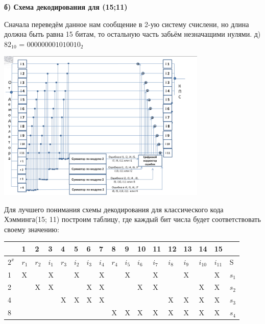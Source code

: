 	\newpage
	\begin{flushleft}
		\textbf{б) Схема декодирования для (15;11)}
		\linebreak
		\vspace*{10mm}
		
		\small Сначала переведём данное нам сообщение в 2-ую систему счислени, но длина должна быть равна 15 битам, то остальную часть забьём незначащими нулями.
		\linebreak
		\small д) $82_{10}$ = $000000001010010_2$
		\linebreak
		\vspace*{5mm}
		
		\includegraphics[width=10cm]{screen8}
		\vspace*{5mm}
		
		\small Для лучшего понимания схемы декодирования для классического кода Хэмминга(15; 11) построим таблицу, где каждый бит числа будет соответствовать своему значению:
		\linebreak
	\end{flushleft}

	\begin{table}[ht]
		\centering
		\begin{tabular}{|p{5mm}|p{5mm}|p{5mm}|p{5mm}|p{5mm}|p{5mm}|p{5mm}|p{5mm}|p{5mm}|p{5mm}|p{5mm}|p{5mm}|p{5mm}|p{5mm}|p{5mm}|p{5mm}|p{5mm}|}
			\hline
			& 1 & 2 & 3 & 4 & 5 & 6 & 7 & 8 & 9 & 10 & 11 & 12 & 13 & 14 & 15 & \\
			\hline
			$2^x$ & $r_1$ & $r_2$ & $i_1$ & $r_3$ & $i_2$ & $i_3$ & $i_4$ & $r_4$ & $i_5$ & $i_6$ & $i_7$ & $i_8$ & $i_9$ & $i_{10}$ & $i_{11}$ & S\\
			\hline
			1 & X & & X & & X & & X & & X & & X & & X & & X & $s_1$\\
			\hline
			2 & & X & X & & & X & X & &  & X & X & & & X & X & $s_2$\\
			\hline
			4 & & & & X & X & X & X & & & & & X & X & X & X & $s_3$\\
			\hline
			8 & & & & & & & & X & X & X & X & X & X & X & X & $s_4$\\
			\hline
		\end{tabular}
	\end{table}
	
